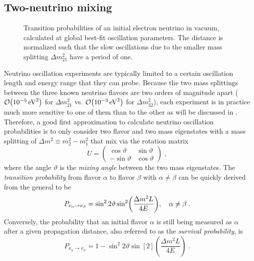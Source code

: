 \subsection{Two-neutrino mixing}
\begin{figure}
    \centering
    
    \caption{Transition probabilities of an initial electron neutrino in vacuum, calculated at global best-fit\cite{nufit40} oscillation parameters. The distance is normalized such that the slow oscillations due to the smaller mass splitting $\Delta m^2_{21}$ have a period of one.\label{fig:simple-oscillogram}}
\end{figure}
Neutrino oscillation experiments are typically limited to a certain oscillation length and energy range that they can probe. Because the two mass splittings between the three known neutrino flavors are two orders of magnitude apart ($\order{\SI{e-5}{eV^2}}$ for $\Delta m^2_{21}$ vs. $\order{\SI{e-3}{eV^2}}$ for $\Delta m^2_{32}$)\cite{nufit40}, each experiment is in practice much more sensitive to one of them than to the other as will be discussed in .
Therefore, a good first approximation to calculate neutrino oscillation probabilities is to only consider two flavor and two mass eigenstates with a mass splitting of $\Delta m^2 \equiv m_2^2 - m_1^2$ that mix via the rotation matrix
\begin{equation}
    U =
    \begin{pmatrix}
        \cos \vartheta & \sin \vartheta \\
        -\sin \vartheta & \cos \vartheta
    \end{pmatrix}\;,\label{eq:two-flav-pmns}
\end{equation}
where the angle $\vartheta$ is the \emph{mixing angle} between the two mass eigenstates.
The \emph{transition probability} from flavor $\alpha$ to flavor $\beta$ with $\alpha \neq \beta$ can be quickly derived from the general  to be
\begin{equation}
    P_{\nu_\alpha \rightarrow \nu_\beta} = \sin^2 2\vartheta \sin[2](\frac{\Delta m^2L}{4E})\qc\alpha \neq \beta\;.
\end{equation}
Conversely, the probability that an initial flavor $\alpha$ is still being measured as $\alpha$ after a given propagation distance, also referred to as the \emph{survival probability}, is
\begin{equation}
    P_{\nu_\alpha \rightarrow \nu_\alpha} = 1 - \sin^2 2\vartheta \sin[2](\frac{\Delta m^2L}{4E})\;.
\end{equation}

